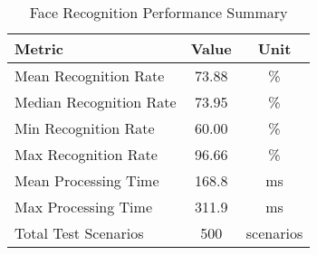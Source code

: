 \begin{table}[htbp]
\centering
\caption{Face Recognition Performance Summary}
\label{tab:face_recognition_summary}
\begin{tabular}{|l|c|c|}
\hline
\textbf{Metric} & \textbf{Value} & \textbf{Unit} \\
\hline
Mean Recognition Rate & 73.88 & \% \\
Median Recognition Rate & 73.95 & \% \\
Min Recognition Rate & 60.00 & \% \\
Max Recognition Rate & 96.66 & \% \\
\hline
Mean Processing Time & 168.8 & ms \\
Max Processing Time & 311.9 & ms \\
\hline
Total Test Scenarios & 500 & scenarios \\
\hline
\end{tabular}
\end{table}